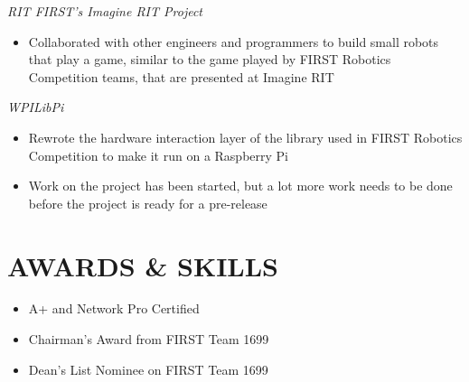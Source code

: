 \documentclass[line,margin]{res}
\begin{document}
\begin{resume}
	\vspace{-8pt}
	{\sl RIT FIRST's Imagine RIT Project}
		\begin{itemize}
			\itemsep 0pt
			\item Collaborated with other engineers and programmers to build small robots that play a game, similar to the game played by FIRST Robotics Competition teams, that are presented at Imagine RIT 
		\end{itemize}
	\vspace{-8pt}
	{\sl WPILibPi}
		\begin{itemize}
			\itemsep 0pt
			\item Rewrote the hardware interaction layer of the library used in FIRST Robotics Competition to make it run on a Raspberry Pi
			\item Work on the project has been started, but a lot more work needs to be done before the project is ready for a pre-release
		\end{itemize}

\section{AWARDS \& SKILLS} 
		\begin{multicols}{2}
			\begin{itemize}
				\itemsep -2pt
				\item[] A+ and Network Pro Certified
				\item[] Chairman's Award from FIRST Team 1699
				\item[] Dean's List Nominee on FIRST Team 1699


\end{itemize}
\end{multicols}
\end{resume}
\end{document}
